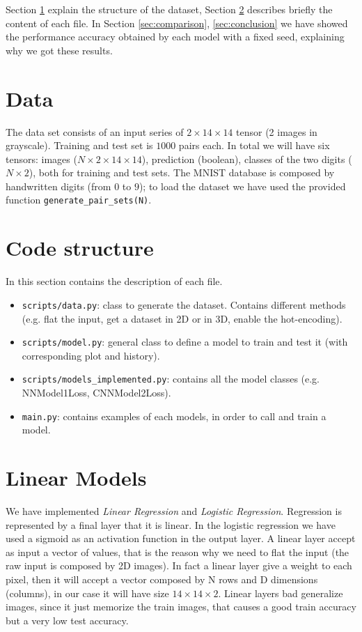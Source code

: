 \documentclass[journal, a4paper]{IEEEtran}
\begin{document}
Section \ref{sec:data} explain the structure of the dataset, Section \ref{sec:codestruc} describes briefly the content of each file. In Section \ref{sec:comparison}, \ref{sec:conclusion} we have showed the performance accuracy obtained by each model with a fixed seed, explaining why we got these results.


\section{Data}
\label{sec:data}
The data set consists of an input series of $2\times14\times14$ tensor (2 images in grayscale). Training and test set is $1000$ pairs each. In total we will have six tensors: images ($N\times2\times14\times14$), prediction (boolean), classes of the two digits ($N\times2$), both for training and test sets. The MNIST database is composed by handwritten digits (from $0$ to $9$); to load the dataset we have used the provided function \texttt{generate\_pair\_sets(N)}.

\section{Code structure}
\label{sec:codestruc}
In this section contains the description of each file.
\begin{itemize}
    \item \texttt{scripts/data.py}: class to generate the dataset. Contains different methods (e.g. flat the input, get a dataset in 2D or in 3D, enable the hot-encoding).
    \item \texttt{scripts/model.py}: general class to define a model to train and test it (with corresponding plot and history).
    \item \texttt{scripts/models\_implemented.py}: contains all the model classes (e.g. NNModel1Loss, CNNModel2Loss).
    \item \texttt{main.py}: contains examples of each models, in order to call and train a model.
\end{itemize}

\section{Linear Models}
\label{sec:linearmodel}
We have implemented \textit{Linear Regression} and \textit{Logistic Regression}. Regression is represented by a final layer that it is linear. In the logistic regression we have used a sigmoid as an activation function in the output layer. A linear layer accept as input a vector of values, that is the reason why we need to flat the input (the raw input is composed by 2D images). In fact a linear layer give a weight to each pixel, then it will accept a vector composed by N rows and D dimensions (columns), in our case it will have size $14 \times 14 \times 2$. Linear layers bad generalize images, since it just memorize the train images, that causes a good train accuracy but a very low test accuracy.
\end{document}
